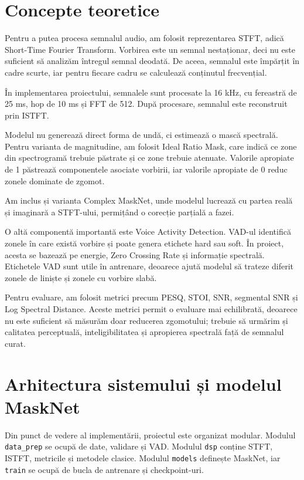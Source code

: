 \documentclass[12pt,a4paper]{article}
\begin{document}
\section*{Concepte teoretice}

Pentru a putea procesa semnalul audio, am folosit reprezentarea STFT, adică Short-Time Fourier Transform. Vorbirea este un semnal nestaționar, deci nu este suficient să analizăm întregul semnal deodată. De aceea, semnalul este împărțit în cadre scurte, iar pentru fiecare cadru se calculează conținutul frecvențial.

În implementarea proiectului, semnalele sunt procesate la 16 kHz, cu fereastră de 25 ms, hop de 10 ms și FFT de 512. După procesare, semnalul este reconstruit prin ISTFT.

Modelul nu generează direct forma de undă, ci estimează o mască spectrală. Pentru varianta de magnitudine, am folosit Ideal Ratio Mask, care indică ce zone din spectrogramă trebuie păstrate și ce zone trebuie atenuate. Valorile apropiate de 1 păstrează componentele asociate vorbirii, iar valorile apropiate de 0 reduc zonele dominate de zgomot.

Am inclus și varianta Complex MaskNet, unde modelul lucrează cu partea reală și imaginară a STFT-ului, permițând o corecție parțială a fazei.

O altă componentă importantă este Voice Activity Detection. VAD-ul identifică zonele în care există vorbire și poate genera etichete hard sau soft. În proiect, acesta se bazează pe energie, Zero Crossing Rate și informație spectrală. Etichetele VAD sunt utile în antrenare, deoarece ajută modelul să trateze diferit zonele de liniște și zonele cu vorbire slabă.

Pentru evaluare, am folosit metrici precum PESQ, STOI, SNR, segmental SNR și Log Spectral Distance. Aceste metrici permit o evaluare mai echilibrată, deoarece nu este suficient să măsurăm doar reducerea zgomotului; trebuie să urmărim și calitatea perceptuală, inteligibilitatea și apropierea spectrală față de semnalul curat.

\section*{Arhitectura sistemului și modelul MaskNet}

Din punct de vedere al implementării, proiectul este organizat modular. Modulul \texttt{data\_prep} se ocupă de date, validare și VAD. Modulul \texttt{dsp} conține STFT, ISTFT, metricile și metodele clasice. Modulul \texttt{models} definește MaskNet, iar \texttt{train} se ocupă de bucla de antrenare și checkpoint-uri.
\end{document}
